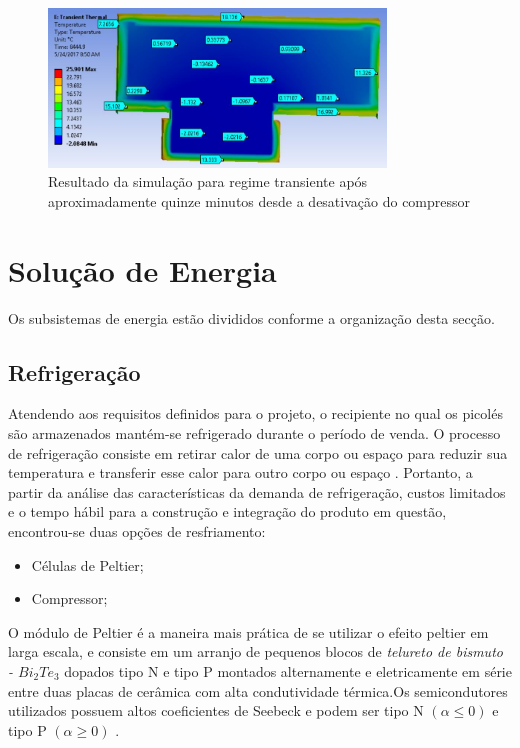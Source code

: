 \begin{itemize}
   \begin{figure}[H]
	\centering
    \includegraphics[width=0.8\textwidth]{figuras/temp_8444}
    \caption{Resultado da simulação para regime transiente após aproximadamente quinze minutos desde a desativação do compressor}
    \label{fig:temp_8444}
\end{figure}

\end{itemize}

\section{Solução de Energia}

Os subsistemas de energia estão divididos conforme a organização desta secção.

\subsection{Refrigeração}
Atendendo aos requisitos definidos para o projeto, o recipiente no qual os picolés são armazenados  mantém-se refrigerado durante o período de venda. O processo de refrigeração consiste em retirar calor de uma corpo ou espaço para reduzir sua temperatura e transferir esse calor para outro corpo ou espaço \cite{campos2010refrigeraccao}. Portanto, a partir da análise das características da demanda de refrigeração, custos limitados e o tempo hábil para a construção e integração do produto em questão, encontrou-se duas opções de resfriamento:

\begin{itemize}
\item Células de Peltier;
\end{itemize}

\begin{itemize}
\item Compressor;
\end{itemize}

O módulo de Peltier é a maneira mais prática de se utilizar o efeito peltier em larga escala, e consiste em um arranjo de pequenos blocos de \textit{telureto de bismuto - $Bi_{2}Te_{3}$} dopados tipo N e tipo P montados alternamente e eletricamente em série entre duas placas de cerâmica com alta condutividade térmica.Os semicondutores utilizados possuem altos coeficientes de Seebeck e podem ser tipo N $(\alpha \leq 0)$ e tipo P $(\alpha \geq 0)$  \cite{campos2010refrigeraccao}.


